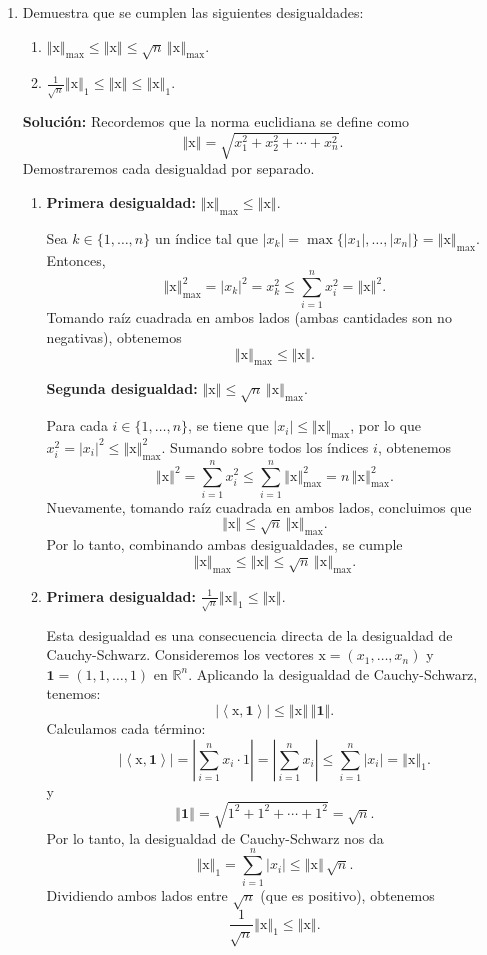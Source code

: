 \documentclass[12pt]{article}
\newcommand{\abs}[1]{\left\vert#1\right\vert}
\newcommand{\norm}[1]{\left\Vert#1\right\Vert}
\newcommand{\R}{\mathbb R}
\newcommand{\x}{\mathrm x}
\newcommand{\lbil}{\left <}
\newcommand{\rbil}{\right >}
\begin{document}
\begin{enumerate}
\item Demuestra que se cumplen las siguientes desigualdades:
\begin{enumerate}[(1)]
\item $\norm{\x}_{\max}\leq \norm{\x}\leq \sqrt{n}\,\norm{\x}_{\max}$.
\item $\frac{1}{\sqrt{n}}\norm{\x}_1\leq \norm{\x}\leq \norm{\x}_1$.
\end{enumerate}

\textbf{Solución: } Recordemos que la norma euclidiana se define como
\[
\norm{\x} = \sqrt{x_1^2 + x_2^2 + \cdots + x_n^2}.
\]
Demostraremos cada desigualdad por separado.

\begin{enumerate}[(1)]
\item \textbf{Primera desigualdad:} $\norm{\x}_{\max}\leq \norm{\x}$.

Sea $k \in \{1, \dots, n\}$ un índice tal que $\abs{x_k} = \max\{\abs{x_1}, \dots, \abs{x_n}\} = \norm{\x}_{\max}$. Entonces,
\[
\norm{\x}_{\max}^2 = \abs{x_k}^2 = x_k^2 \leq \sum_{i=1}^{n} x_i^2 = \norm{\x}^2.
\]
Tomando raíz cuadrada en ambos lados (ambas cantidades son no negativas), obtenemos
\[
\norm{\x}_{\max} \leq \norm{\x}.
\]

\textbf{Segunda desigualdad:} $\norm{\x}\leq \sqrt{n}\,\norm{\x}_{\max}$.

Para cada $i \in \{1, \dots, n\}$, se tiene que $\abs{x_i} \leq \norm{\x}_{\max}$, por lo que $x_i^2 = \abs{x_i}^2 \leq \norm{\x}_{\max}^2$. Sumando sobre todos los índices $i$, obtenemos
\[
\norm{\x}^2 = \sum_{i=1}^{n} x_i^2 \leq \sum_{i=1}^{n} \norm{\x}_{\max}^2 = n\,\norm{\x}_{\max}^2.
\]
Nuevamente, tomando raíz cuadrada en ambos lados, concluimos que
\[
\norm{\x} \leq \sqrt{n}\,\norm{\x}_{\max}.
\]
Por lo tanto, combinando ambas desigualdades, se cumple
\[
\norm{\x}_{\max}\leq \norm{\x}\leq \sqrt{n}\,\norm{\x}_{\max}.
\]

\item \textbf{Primera desigualdad:} $\frac{1}{\sqrt{n}}\norm{\x}_1\leq \norm{\x}$.

Esta desigualdad es una consecuencia directa de la desigualdad de Cauchy-Schwarz. Consideremos los vectores $\x = (x_1, \dots, x_n)$ y $\mathbf{1} = (1, 1, \dots, 1)$ en $\R^n$. Aplicando la desigualdad de Cauchy-Schwarz, tenemos:
\[
\abs{\lbil \x, \mathbf{1} \rbil} \leq \norm{\x}\,\norm{\mathbf{1}}.
\]
Calculamos cada término:
\[
\abs{\lbil \x, \mathbf{1} \rbil} = \abs{\sum_{i=1}^{n} x_i \cdot 1} = \abs{\sum_{i=1}^{n} x_i} \leq \sum_{i=1}^{n} \abs{x_i} = \norm{\x}_1.
\]
y
\[
\norm{\mathbf{1}} = \sqrt{1^2 + 1^2 + \cdots + 1^2} = \sqrt{n}.
\]
Por lo tanto, la desigualdad de Cauchy-Schwarz nos da
\[
\norm{\x}_1 = \sum_{i=1}^{n} \abs{x_i} \leq \norm{\x}\,\sqrt{n}.
\]
Dividiendo ambos lados entre $\sqrt{n}$ (que es positivo), obtenemos
\[
\frac{1}{\sqrt{n}}\norm{\x}_1 \leq \norm{\x}.
\]


\end{enumerate}
\end{enumerate}
\end{document}

